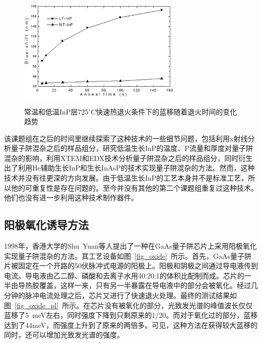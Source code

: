 \documentclass{ZJUthesis}
\begin{document}
\begin{figure}[htbp]
  \centering
  \includegraphics[width=0.7\textwidth]{./Pictures/ltinp.eps}\\
  \caption{常温和低温InP层725$^{\circ}$C快速热退火条件下的蓝移随着退火时间的变化趋势}
  \label{fig_ltinp}
\end{figure}

该课题组在之后的时间里继续探索了这种技术的一些细节问题，包括利用x射线分析量子阱混杂之后的样品组分\cite{Lee2001Enhanced}，研究低温生长InP的温度、P流量和厚度对量子阱混杂的影响\cite{Gordon2003Quantum}，利用XTEM和EDX技术分析量子阱混杂之后的样品组分\cite{Hulko2006Quantitative}，同时衍生出了利用He辅助生长InP\cite{Zhang2003Quantum}和生长InAsP\cite{Hulko2009Quantum}的技术实现量子阱混杂的方法。然而，这种技术并没有往更深的方向发展。由于低温生长InP的工艺本身并不是标准工艺，所以他的可重复性是存在问题的。至今并没有其他的第二个课题组重复过这种技术。他们也没有进一步利用这种技术制作器件。

\subsection{阳极氧化诱导方法}

1998年，香港大学的Shu~Yuan等人提出了一种在GaAs量子阱芯片上采用阳极氧化实现量子阱混杂的方法\cite{Yuan1998Anodic}\cite{Yuan1998Anodic2}。其工艺设备如图~\ref{fig_oxide}~所示。首先，GaAs量子阱片被固定在一个开路的50伏脉冲式电源的阳极上。阳极和阴极之间通过导电液传到电流。导电液由乙二醇、磷酸和去离子水用40:20:1的体积比配制而成。芯片的一半由导热胶覆盖，这样一来，只有另一半暴露在导电液中的部分会被氧化。经过几分钟的脉冲电流处理之后，芯片又进行了快速退火处理。最终的测试结果如图~\ref{fig_oxide_pl}~所示。在芯片没有被氧化的部分，光致发光谱的峰值波长仅仅蓝移了5~meV左右，同时强度下降到只剩原来的1/20。而对于氧化过的部分，蓝移达到了44meV，而强度上升到了原来的两倍多。可见，这种方法在获得较大蓝移的同时，还可以增加光致发光谱的强度。
\end{document}
